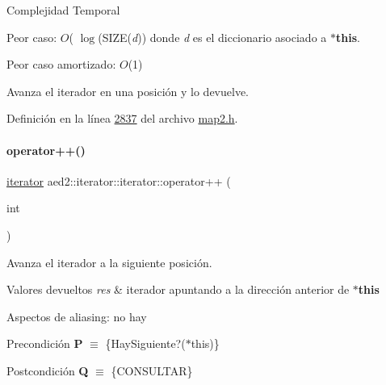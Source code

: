 \begin{DoxyDescription}
\item[Complejidad Temporal]
\begin{DoxyItemize}
\item Peor caso\+: $O$( $\log$(S\+I\+ZE({\itshape d})) donde {\itshape d} es el diccionario asociado a {\bfseries $\ast$this}.
\item Peor caso amortizado\+: $O$(1) 
\end{DoxyItemize}
\end{DoxyDescription}

Avanza el iterador en una posición y lo devuelve. 

Definición en la línea \hyperlink{map2_8h_source_l02837}{2837} del archivo \hyperlink{map2_8h_source}{map2.\+h}.

\mbox{\label{classaed2_1_1iterator_1_1iterator_aa2023454f3ce45f7da4ef23d7a7f6749_aa2023454f3ce45f7da4ef23d7a7f6749}} 
\paragraph{\texorpdfstring{operator++()}{operator++()}\hspace{0.1cm}{\footnotesize\ttfamily [2/2]}}
{\footnotesize\ttfamily \hyperlink{classaed2_1_1iterator_1_1iterator}{iterator} aed2\+::iterator\+::iterator\+::operator++ (\begin{DoxyParamCaption}\item[{int}]{ }\end{DoxyParamCaption})\hspace{0.3cm}{\ttfamily [inline]}}



Avanza el iterador a la siguiente posición. 


\begin{DoxyRetVals}{Valores devueltos}
{\em res} & iterador apuntando a la dirección anterior de {\bfseries $\ast$this}\\
\hline
\end{DoxyRetVals}
\begin{DoxyParagraph}{Aspectos de aliasing\+:}
no hay
\end{DoxyParagraph}
\begin{DoxyPrecond}{Precondición}
{\bfseries P} $\equiv$ \{Hay\+Siguiente?($\ast$this)\} 
\end{DoxyPrecond}
\begin{DoxyPostcond}{Postcondición}
{\bfseries Q} $\equiv$ \{C\+O\+N\+S\+U\+L\+T\+AR\}
\end{DoxyPostcond}

